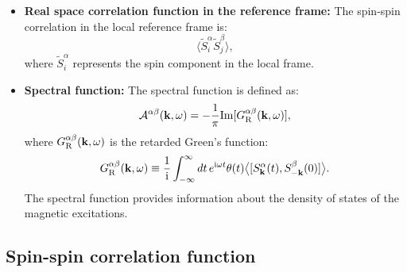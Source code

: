 \documentclass[aps, prx, nofootinbib, superscriptaddress]{revtex4-2}
\newcommand{\kvec}{\mathbf{k}}
\newcommand{\ri}{\mathrm{i}}
\begin{document}
\begin{itemize}
    \item \textbf{Real space correlation function in the reference frame:}
    The spin-spin correlation in the local reference frame is:
    \begin{equation}
        \langle \widetilde{S}^{\alpha}_{i} \widetilde{S}_{j}^{\beta} \rangle,
    \end{equation}
    where $\widetilde{S}^{\alpha}_{i}$ represents the spin component in the local frame.
    
    \item \textbf{Spectral function:}
    The spectral function is defined as:
    \begin{equation}
        \mathcal{A}^{\alpha\beta}(\kvec, \omega) = -\frac{1}{\pi} \mathrm{Im}[G^{\alpha\beta}_{\rm R}(\kvec, \omega)],
    \end{equation}
    where $G^{\alpha\beta}_{\rm R}(\kvec, \omega)$ is the retarded Green's function:
    \begin{equation}
        G^{\alpha\beta}_{\rm R}(\kvec, \omega) 
        \equiv \frac{1}{\ri} \int_{-\infty}^{\infty} dt \, e^{\ri \omega t} \theta(t) \big\langle [S_{\kvec}^{\alpha}(t), S_{-\kvec}^{\beta}(0)] \big\rangle.
    \end{equation}
    The spectral function provides information about the density of states of the magnetic excitations.
\end{itemize}




\subsection{Spin-spin correlation function}\label{subsec: Real-Time (Dynamical) Spin-Spin Correlation Function}
\end{document}
